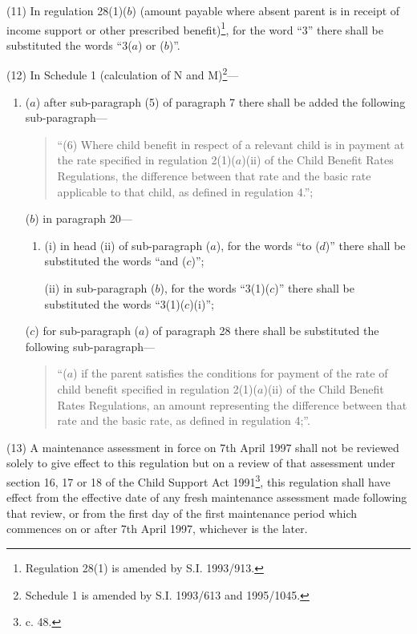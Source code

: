 \documentclass[a4paper]{article}
\begin{document}
(11)  In regulation 28(1)($b$) (amount payable where absent parent is in receipt of income support or other prescribed benefit)\footnote{\frenchspacing Regulation 28(1) is amended by S.I. 1993/913.}, for the word “3” there shall be substituted the words “3($a$) or ($b$)”.

(12) In Schedule 1 (calculation of N and M)\footnote{\frenchspacing Schedule 1 is amended by S.I. 1993/613 and 1995/1045.}---
\begin{enumerate}\item[]
($a$) after sub-paragraph (5) of paragraph 7 there shall be added the following sub-paragraph—
\begin{quotation}
“(6) Where child benefit in respect of a relevant child is in payment at the rate specified in regulation 2(1)($a$)(ii) of the Child Benefit Rates Regulations, the difference between that rate and the basic rate applicable to that child, as defined in regulation 4.”;
\end{quotation}

($b$) in paragraph 20—
\begin{enumerate}\item[]
(i) in head (ii) of sub-paragraph ($a$), for the words “to ($d$)” there shall be substituted the words “and ($c$)”;

(ii) in sub-paragraph ($b$), for the words “3(1)($c$)” there shall be substituted the words “3(1)($c$)(i)”;
\end{enumerate}

($c$) for sub-paragraph ($a$) of paragraph 28 there shall be substituted the following sub-paragraph—
\begin{quotation}
“($a$) if the parent satisfies the conditions for payment of the rate of child benefit specified in regulation 2(1)($a$)(ii) of the Child Benefit Rates Regulations, an amount representing the difference between that rate and the basic rate, as defined in regulation 4;”.
\end{quotation}
\end{enumerate}

(13)  A maintenance assessment in force on 7th April 1997 shall not be reviewed solely to give effect to this regulation but on a review of that assessment under section 16, 17 or 18 of the Child Support Act 1991\footnote{ c. 48.}, this regulation shall have effect from the effective date of any fresh maintenance assessment made following that review, or from the first day of the first maintenance period which commences on or after 7th April 1997, whichever is the later.
\end{document}
